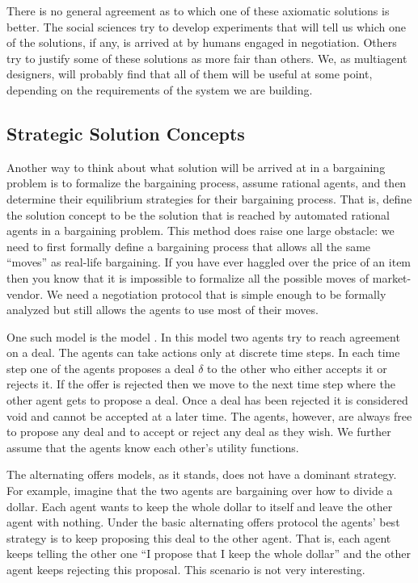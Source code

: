 \medskip

There is no general agreement as to which one of these axiomatic
solutions is better. The social sciences try to develop experiments
that will tell us which one of the solutions, if any, is arrived at by
humans engaged in negotiation. Others try to justify some of these
solutions as more fair than others. We, as multiagent designers, will
probably find that all of them will be useful at some point, depending
on the requirements of the system we are building.


\subsection{Strategic Solution Concepts}
\label{sec:strat-solut-conc}

Another way to think about what solution will be arrived at in a
bargaining problem is to formalize the bargaining process, assume
rational agents, and then determine their equilibrium strategies for
their bargaining process. That is, define the solution concept to be
the solution that is reached by automated rational agents in a bargaining
problem.  This method does raise one large obstacle: we need to first
formally define a bargaining process that allows all the same
``moves'' as real-life bargaining. If you have ever haggled over the
price of an item then you know that it is impossible to formalize all
the possible moves of market-vendor. We need a negotiation protocol
that is simple enough to be formally analyzed but still allows the
agents to use most of their moves.

One such model is the  model
\cite{rubinstein82a}. In this model two agents try to reach agreement
on a deal. The agents can take actions only at discrete time steps. In
each time step one of the agents proposes a deal $\delta$ to the other
who either accepts it or rejects it. If the offer is rejected then we
move to the next time step where the other agent gets to propose a
deal. Once a deal has been rejected it is considered void and cannot
be accepted at a later time.  The agents, however, are always free to
propose any deal and to accept or reject any deal as they wish. We
further assume that the agents know each other's utility functions.

The alternating offers models, as it stands, does not have a dominant
strategy. For example, imagine that the two agents are bargaining over
how to divide a dollar. Each agent wants to keep the whole dollar to
itself and leave the other agent with nothing. Under the basic
alternating offers protocol the agents' best strategy is to keep
proposing this deal to the other agent. That is, each agent keeps
telling the other one ``I propose that I keep the whole dollar'' and
the other agent keeps rejecting this proposal. This scenario is not
very interesting.

